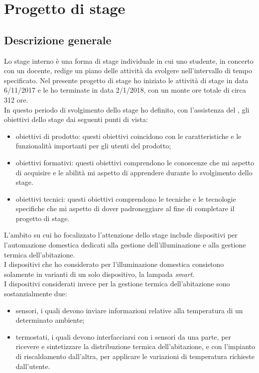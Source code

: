 
\pagebreak
\chapter{Progetto di stage}
\label{cap:processi-metodologie}

\section{Descrizione generale}

Lo stage interno è una forma di stage individuale in cui uno studente, in concerto con un docente, redige un piano delle attività da svolgere nell'intervallo di tempo specificato.
Nel presente progetto di stage ho iniziato le attività di stage in data 6/11/2017 e le ho terminate in data 2/1/2018, con un monte ore totale di circa 312 ore. \\
In questo periodo di svolgimento dello stage ho definito, con l'assistenza del \profTitle \myProf, gli obiettivi dello stage dai seguenti punti di vista:
\begin{itemize}
  \item obiettivi di prodotto: questi obiettivi coincidono con le caratteristiche e le funzionalità importanti per gli utenti del prodotto;
  \item obiettivi formativi: questi obiettivi comprendono le conoscenze che mi aspetto di acquisire e le abilità mi aspetto di apprendere durante lo svolgimento dello stage.
  \item obiettivi tecnici: questi obiettivi comprendono le tecniche e le tecnologie specifiche che mi aspetto di dover padroneggiare al fine di completare il progetto di stage.
\end{itemize}
\bigskip
L'ambito su cui ho focalizzato l'attenzione dello stage include dispositivi per l'automazione domestica dedicati alla gestione dell'illuminazione e alla gestione termica dell'abitazione. \\
I dispositivi che ho considerato per l'illuminazione domestica consistono solamente in varianti di un solo dispositivo, la lampada \emph{smart}. \\
I dispositivi considerati invece per la gestione termica dell'abitazione sono sostanzialmente due:
\begin{itemize}
  \item sensori, i quali devono inviare informazioni relative alla temperatura di un determinato ambiente;
  \item termostati, i quali devono interfacciarsi con i sensori da una parte, per ricevere e sintetizzare la distribuzione termica dell'abitazione, e con l'impianto di riscaldamento dall'altra, per applicare le variazioni di temperatura richieste dall'utente.
\end{itemize}

